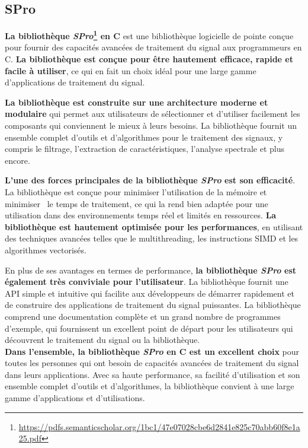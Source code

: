 \subsection{SPro}
\label{subsec:SPro}

\textbf{La bibliothèque \textit{SPro}\footnote{\url{https://pdfs.semanticscholar.org/1bc1/47e07028cbe6d2841e825c70abb60f8e1a25.pdf}} en C} est une bibliothèque logicielle de pointe conçue pour fournir des capacités avancées de traitement du signal
aux programmeurs en C. \textbf{La bibliothèque est conçue pour être hautement efficace, rapide et facile à utiliser}, ce qui en fait un choix idéal
pour une large gamme d'applications de traitement du signal.

\textbf{La bibliothèque est construite sur une architecture moderne et modulaire} qui permet aux utilisateurs de sélectionner et d'utiliser facilement
les composants qui conviennent le mieux à leurs besoins. La bibliothèque fournit un ensemble complet d'outils et d'algorithmes pour le traitement des signaux,
y compris le filtrage, l'extraction de caractéristiques, l'analyse spectrale et plus encore.

\textbf{L'une des forces principales de la bibliothèque \textit{SPro} est son efficacité}. La bibliothèque est conçue pour minimiser l'utilisation de la mémoire et minimiser \
le temps de traitement, ce qui la rend bien adaptée pour une utilisation dans des environnements temps réel et limités en ressources. \textbf{La bibliothèque est hautement optimisée pour
    les performances}, en utilisant des techniques avancées telles que le multithreading, les instructions SIMD et les algorithmes vectorisés.

En plus de ses avantages en termes de performance, \textbf{la bibliothèque \textit{SPro} est également très conviviale pour l'utilisateur}. La bibliothèque fournit une API simple
et intuitive qui facilite aux développeurs de démarrer rapidement et de construire des applications de traitement du signal puissantes. La bibliothèque comprend une documentation
complète et un grand nombre de programmes d'exemple, qui fournissent un excellent point de départ pour les utilisateurs qui découvrent le traitement du signal ou la bibliothèque.\\

\textbf{Dans l'ensemble, la bibliothèque \textit{SPro} en C est un excellent choix} pour toutes les personnes qui ont besoin de capacités avancées de traitement du signal dans leurs applications.
Avec sa haute performance, sa facilité d'utilisation et son ensemble complet d'outils et d'algorithmes, la bibliothèque convient à une large gamme d'applications et d'utilisations.

